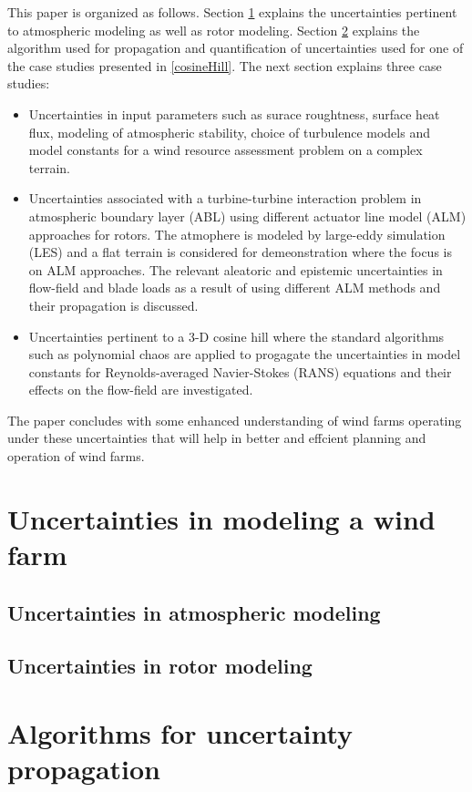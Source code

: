 \documentclass[]{aiaa-tc}%
\begin{document}
This paper is organized as follows. Section \ref{uq_windfarm} explains the uncertainties pertinent to atmospheric modeling as well as rotor modeling. 
Section \ref{uq_algo} explains the algorithm used for propagation and quantification of uncertainties used for one of the case studies presented in \ref{cosineHill}. The next section explains three case studies:
\begin{itemize}
  \item Uncertainties in input parameters such as surace roughtness, surface heat flux, modeling of atmospheric stability, choice of turbulence models and model constants for a wind resource assessment problem on a complex terrain.
  \item Uncertainties associated with a turbine-turbine interaction problem in atmospheric boundary layer (ABL) using different actuator line model (ALM) approaches for rotors. The atmophere is modeled by large-eddy simulation (LES) and a flat terrain is considered for demeonstration where the focus is on ALM approaches. The relevant aleatoric and epistemic uncertainties in flow-field and blade loads as a result of using different ALM methods and their propagation is discussed.
  \item Uncertainties pertinent to a 3-D cosine hill where the standard algorithms such as polynomial chaos are applied to progagate the uncertainties in model constants for Reynolds-averaged Navier-Stokes (RANS) equations and their effects on the flow-field are investigated.  
\end{itemize}
  
The paper concludes with some enhanced understanding of wind farms operating under these uncertainties that will help in better and effcient planning and operation of wind farms.

\section{Uncertainties in modeling a wind farm} \label{uq_windfarm}
\subsection{Uncertainties in atmospheric modeling}
\subsection{Uncertainties in rotor modeling}


\section{Algorithms for uncertainty propagation} \label{uq_algo}
\end{document}
